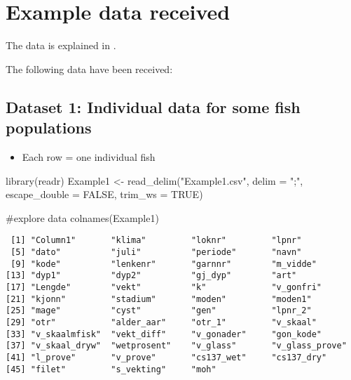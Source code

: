 \documentclass[
]{article}
\newenvironment{Shaded}{\begin{snugshade}}{\end{snugshade}}
\newcommand{\AttributeTok}[1]{\textcolor[rgb]{0.40,0.45,0.13}{#1}}
\newcommand{\CommentTok}[1]{\textcolor[rgb]{0.37,0.37,0.37}{#1}}
\newcommand{\ConstantTok}[1]{\textcolor[rgb]{0.56,0.35,0.01}{#1}}
\newcommand{\FunctionTok}[1]{\textcolor[rgb]{0.28,0.35,0.67}{#1}}
\newcommand{\NormalTok}[1]{\textcolor[rgb]{0.00,0.23,0.31}{#1}}
\newcommand{\OtherTok}[1]{\textcolor[rgb]{0.00,0.23,0.31}{#1}}
\newcommand{\StringTok}[1]{\textcolor[rgb]{0.13,0.47,0.30}{#1}}
\providecommand{\tightlist}{%
  \setlength{\itemsep}{0pt}\setlength{\parskip}{0pt}}\usepackage{longtable,booktabs,array}
\begin{document}
\hypertarget{example-data-received}{%
\section{Example data received}\label{example-data-received}}

The data is explained in \cite{baerum2021population}.

The following data have been received:

\hypertarget{dataset-1-individual-data-for-some-fish-populations}{%
\subsection{Dataset 1: Individual data for some fish
populations}\label{dataset-1-individual-data-for-some-fish-populations}}

\begin{itemize}
\tightlist
\item
  Each row = one individual fish
\end{itemize}

\begin{Shaded}
\begin{Highlighting}[]
\FunctionTok{library}\NormalTok{(readr)}
\NormalTok{Example1 }\OtherTok{\textless{}{-}} \FunctionTok{read\_delim}\NormalTok{(}\StringTok{"Example1.csv"}\NormalTok{, }\AttributeTok{delim =} \StringTok{";"}\NormalTok{, }\AttributeTok{escape\_double =} \ConstantTok{FALSE}\NormalTok{, }\AttributeTok{trim\_ws =} \ConstantTok{TRUE}\NormalTok{)}

\CommentTok{\#explore data}
\FunctionTok{colnames}\NormalTok{(Example1)}
\end{Highlighting}
\end{Shaded}

\begin{verbatim}
 [1] "Column1"       "klima"         "loknr"         "lpnr"         
 [5] "dato"          "juli"          "periode"       "navn"         
 [9] "kode"          "lenkenr"       "garnnr"        "m_vidde"      
[13] "dyp1"          "dyp2"          "gj_dyp"        "art"          
[17] "Lengde"        "vekt"          "k"             "v_gonfri"     
[21] "kjonn"         "stadium"       "moden"         "moden1"       
[25] "mage"          "cyst"          "gen"           "lpnr_2"       
[29] "otr"           "alder_aar"     "otr_1"         "v_skaal"      
[33] "v_skaalmfisk"  "vekt_diff"     "v_gonader"     "gon_kode"     
[37] "v_skaal_dryw"  "wetprosent"    "v_glass"       "v_glass_prove"
[41] "l_prove"       "v_prove"       "cs137_wet"     "cs137_dry"    
[45] "filet"         "s_vekting"     "moh"          
\end{verbatim}
\end{document}
